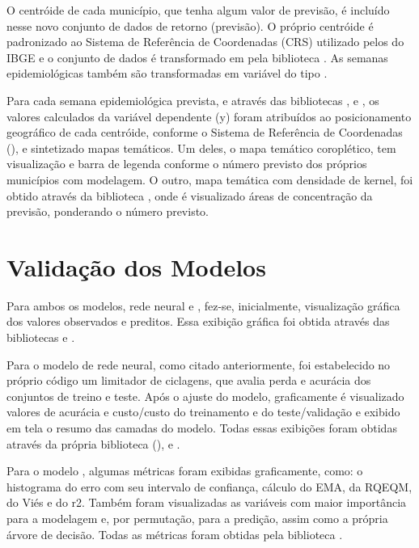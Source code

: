 \indent O centróide de cada município, que tenha algum valor de previsão, é incluído nesse novo conjunto de dados de retorno (previsão). O próprio centróide é padronizado ao Sistema de Referência de Coordenadas (\acrfull{CRS}) utilizado pelos  do \acrshort{IBGE} e o conjunto  de dados é transformado em  pela biblioteca . As semanas epidemiológicas também são transformadas em variável do tipo .

\indent Para cada semana epidemiológica prevista, e através das bibliotecas ,  e , os valores calculados da variável dependente (y) foram atribuídos ao posicionamento geográfico de cada centróide, conforme o Sistema de Referência de Coordenadas (), e sintetizado mapas temáticos. Um deles, o mapa temático coroplético, tem visualização e barra de legenda conforme o número previsto dos próprios municípios com modelagem. O outro, mapa temática com densidade de kernel, foi obtido através da biblioteca , onde é visualizado áreas de concentração da previsão, ponderando o número previsto.

\section{Validação dos Modelos}

\indent Para ambos os modelos, rede neural e , fez-se, inicialmente, visualização gráfica dos valores observados e preditos. Essa exibição gráfica foi obtida através das bibliotecas  e .

\indent Para o modelo de rede neural, como citado anteriormente, foi estabelecido no próprio código um limitador de ciclagens, que avalia perda e acurácia dos conjuntos de treino e teste. Após o ajuste do modelo, graficamente é visualizado valores de acurácia e custo/custo do treinamento e do teste/validação e exibido em tela o resumo das camadas do modelo. Todas essas exibições foram obtidas através da própria biblioteca (),  e .

\indent Para o modelo , algumas métricas foram exibidas graficamente, como: o histograma do erro com seu intervalo de confiança, cálculo do \acrfull{EMA}, da \acrfull{RQEQM}, do Viés e do \acrfull{r2}. Também foram visualizadas as variáveis com maior importância para a modelagem e, por permutação, para a predição, assim como a própria árvore de decisão. Todas as métricas foram obtidas pela biblioteca .

